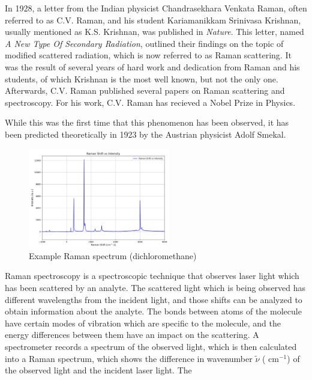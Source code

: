 In 1928, a letter from the Indian physicist Chandrasekhara Venkata Raman, often referred to as C.V. Raman, and his student Kariamanikkam Srinivasa Krishnan, usually mentioned as K.S. Krishnan, was published in \textit{Nature}. This letter, named \textit{A New Type Of Secondary Radiation}, outlined their findings on the topic of modified scattered radiation, which is now referred to as Raman scattering. It was the result of several years of hard work and dedication from Raman and his students, of which Krishnan is the most well known, but not the only one. Afterwards, C.V. Raman published several papers on Raman scattering and spectroscopy. For his work, C.V. Raman has recieved a Nobel Prize in Physics. \cite{ram28}
\bigskip

While this was the first time that this phenomenon has been observed, it has been predicted theoretically in 1923 by the Austrian physicist Adolf Smekal. 
\bigskip

\begin{figure} %
    \centering
    \vspace{-25pt}
    \includegraphics[width=0.55\textwidth]{images/raman_spectra/raman_shift_DCM.png}
    \caption{Example Raman spectrum (dichloromethane)}
    \label{fig:ex_dcm}
    \vspace{-15pt}
\end{figure}


Raman spectroscopy is a spectroscopic technique that observes laser light which has been scattered by an analyte. The scattered light which is being observed has different wavelengths from the incident light, and those shifts can be analyzed to obtain information about the analyte. The bonds between atoms of the molecule have certain modes of vibration which are specific to the molecule, and the energy differences between them have an impact on the scattering. A spectrometer records a spectrum of the observed light, which is then calculated into a Raman spectrum, which shows the difference in wavenumber \( \widetilde{\nu}\) ( cm\(^{-1}\)) of the observed light and the incident laser light. The 



